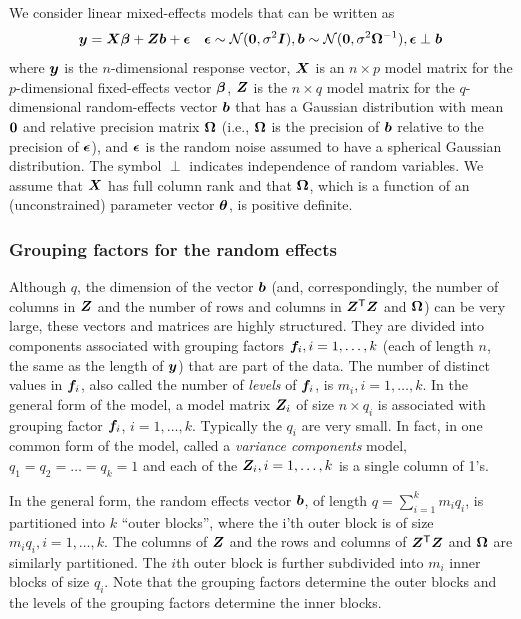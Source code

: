 \documentclass[12pt]{article}
\begin{document}
We consider linear mixed-effects models that can be written as
\begin{equation}
  \label{eq:lmeGeneral}
  \bm{y}=\bm{X}\bm{\beta}+\bm{Z}\bm{b}+\bm{\epsilon}\quad
  \bm{\epsilon}\sim\mathcal{N}(\bm{0},\sigma^2\bm{I}),
  \bm{b}\sim\mathcal{N}(\bm{0},\sigma^2\bm{\Omega}^{-1}),
  \bm{\epsilon}\perp\bm{b}
\end{equation}
where $\bm{y}$ is the $n$-dimensional response vector, $\bm{X}$ is an
$n\times p$ model matrix for the $p$-dimensional fixed-effects vector
$\bm{\beta}$, $\bm{Z}$ is the $n\times q$ model matrix for the
$q$-dimensional random-effects vector $\bm{b}$ that has a Gaussian
distribution with mean $\bm{0}$ and relative precision matrix $\bm{\Omega}$
(i.e., $\bm{\Omega}$ is the precision of $\bm{b}$ relative to the precision
of $\bm{\epsilon}$), and $\bm{\epsilon}$ is the random noise assumed to have a
spherical Gaussian distribution.  The symbol $\perp$ indicates
independence of random variables.  We assume that $\bm{X}$ has full
column rank and that $\bm{\Omega}$, which is a function of an
(unconstrained) parameter vector $\bm{\theta}$, is positive definite.


\subsubsection{Grouping factors for the random effects}

Although $q$, the dimension of the vector $\bm{b}$ (and, correspondingly,
the number of columns in $\bm{Z}$ and the number of rows and columns in
$\bm{Z}^\mathsf{T}\bm{Z}$ and $\bm{\Omega}$) can be very large, these vectors and
matrices are highly structured.  They are divided into components
associated with grouping factors $\bm{f}_i,i=1,\dots,k$ (each of length
$n$, the same as the length of $\bm{y}$) that are part of the data.  The
number of distinct values in $\bm{f}_i$, also called the number of
\emph{levels} of $\bm{f}_i$, is $m_i,i=1,\dots,k$.  In the general form
of the model, a model matrix $\bm{Z}_i$ of size $n\times q_i$ is
associated with grouping factor $\bm{f}_i$, $i=1,\dots,k$.  Typically
the $q_i$ are very small.  In fact, in one common form of the model,
called a \emph{variance components} model, $q_1=q_2=\dots=q_k=1$ and
each of the $\bm{Z}_i,i=1,\dots,k$ is a single column of 1's.

In the general form, the random effects vector $\bm{b}$, of length
$q=\sum_{i=1}^k m_i q_i$, is partitioned into $k$ ``outer blocks'',
where the i'th outer block is of size $m_i q_i,i=1,\dots,k$.  The
columns of $\bm{Z}$ and the rows and columns of $\bm{Z}^\mathsf{T}\bm{Z}$ and
$\bm{\Omega}$ are similarly partitioned.  The $i$th outer block is further
subdivided into $m_i$ inner blocks of size $q_i$.  Note that the
grouping factors determine the outer blocks and the levels of the
grouping factors determine the inner blocks.
\end{document}
